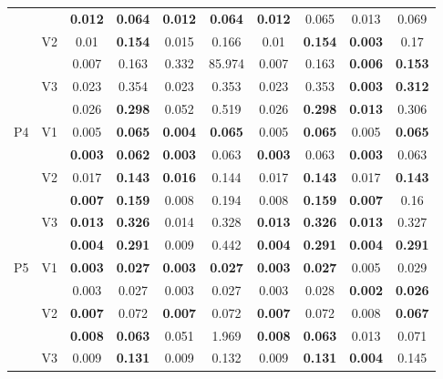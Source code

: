 \documentclass[12pt,a4paper]{article}
\begin{document}
\begin{sidewaystable}[ht]
{\begin{tabular}{cc|cc|cc|cc|cc|}
   &  & \textbf{0.012} & \textbf{0.064} & \textbf{0.012} & \textbf{0.064} & \textbf{0.012} & 0.065 & 0.013 & 0.069 \\ 
   & \multirow{2}{*}{V2} & 0.01 & \textbf{0.154} & 0.015 & 0.166 & 0.01 & \textbf{0.154} & \textbf{0.003} & 0.17 \\ 
   &  & 0.007 & 0.163 & 0.332 & 85.974 & 0.007 & 0.163 & \textbf{0.006} & \textbf{0.153} \\ 
   & \multirow{2}{*}{V3} & 0.023 & 0.354 & 0.023 & 0.353 & 0.023 & 0.353 & \textbf{0.003} & \textbf{0.312} \\ 
   &  & 0.026 & \textbf{0.298} & 0.052 & 0.519 & 0.026 & \textbf{0.298} & \textbf{0.013} & 0.306 \\ 
   \hline \hline\multirow{6}{*}{P4} & \multirow{2}{*}{V1} & 0.005 & \textbf{0.065} & \textbf{0.004} & \textbf{0.065} & 0.005 & \textbf{0.065} & 0.005 & \textbf{0.065} \\ 
   &  & \textbf{0.003} & \textbf{0.062} & \textbf{0.003} & 0.063 & \textbf{0.003} & 0.063 & \textbf{0.003} & 0.063 \\ 
   & \multirow{2}{*}{V2} & 0.017 & \textbf{0.143} & \textbf{0.016} & 0.144 & 0.017 & \textbf{0.143} & 0.017 & \textbf{0.143} \\ 
   &  & \textbf{0.007} & \textbf{0.159} & 0.008 & 0.194 & 0.008 & \textbf{0.159} & \textbf{0.007} & 0.16 \\ 
   & \multirow{2}{*}{V3} & \textbf{0.013} & \textbf{0.326} & 0.014 & 0.328 & \textbf{0.013} & \textbf{0.326} & \textbf{0.013} & 0.327 \\ 
   &  & \textbf{0.004} & \textbf{0.291} & 0.009 & 0.442 & \textbf{0.004} & \textbf{0.291} & \textbf{0.004} & \textbf{0.291} \\ 
   \hline \hline\multirow{6}{*}{P5} & \multirow{2}{*}{V1} & \textbf{0.003} & \textbf{0.027} & \textbf{0.003} & \textbf{0.027} & \textbf{0.003} & \textbf{0.027} & 0.005 & 0.029 \\ 
   &  & 0.003 & 0.027 & 0.003 & 0.027 & 0.003 & 0.028 & \textbf{0.002} & \textbf{0.026} \\ 
   & \multirow{2}{*}{V2} & \textbf{0.007} & 0.072 & \textbf{0.007} & 0.072 & \textbf{0.007} & 0.072 & 0.008 & \textbf{0.067} \\ 
   &  & \textbf{0.008} & \textbf{0.063} & 0.051 & 1.969 & \textbf{0.008} & \textbf{0.063} & 0.013 & 0.071 \\ 
   & \multirow{2}{*}{V3} & 0.009 & \textbf{0.131} & 0.009 & 0.132 & 0.009 & \textbf{0.131} & \textbf{0.004} & 0.145 \\ 

\end{tabular}}
\end{sidewaystable}
\end{document}
